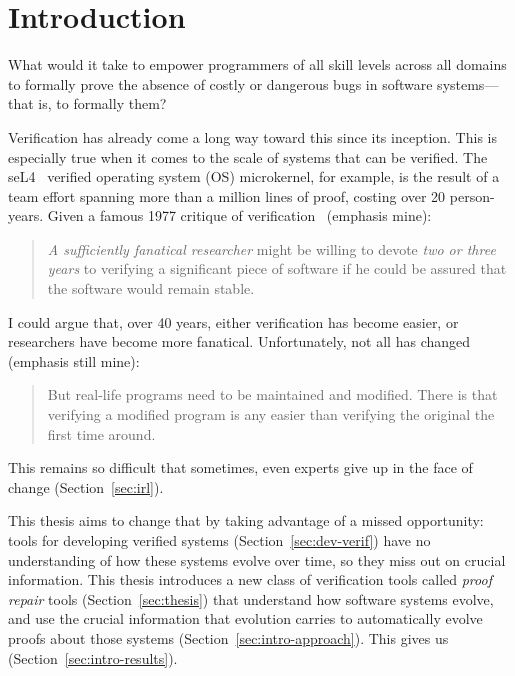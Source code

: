 \chapter{Introduction}



What would it take to empower programmers of all skill levels across all domains to formally prove
the absence of costly or dangerous bugs in software systems---that is, to formally  them?

Verification has already come a long way toward this since its inception.
This is especially true when it comes to the scale of systems that can be verified.
The seL4~\cite{Klein2009} verified operating system (OS) microkernel, for example,
is the result of a team effort spanning more than
a million lines of proof, costing over 20 person-years.
Given a famous 1977 critique of verification~\cite{DeMillo1977} (emphasis mine):

\begin{quote}
\textit{A sufficiently fanatical researcher}
might be willing to devote \textit{two or 
three years} to verifying a significant 
piece of software if he could be 
assured that the software would remain stable.
\end{quote}
I could argue that, over 40 years, either verification has become easier,
or researchers have become more fanatical. Unfortunately, not all has changed (emphasis still mine):

\begin{quote}
But real-life programs need to 
be maintained and modified. 
There is  that verifying a modified program is any 
easier than verifying the original the 
first time around.
\end{quote}
This remains so difficult that sometimes, even experts give up in the face of change (Section~\ref{sec:irl}).

This thesis aims to change that by taking advantage of a missed opportunity: tools for developing verified systems (Section~\ref{sec:dev-verif})
have no understanding of how these systems evolve over time, so they miss out on crucial information.
This thesis introduces a new class of verification tools called \textit{proof repair} tools (Section~\ref{sec:thesis})
that understand how software systems evolve, and use the crucial information that evolution carries
to automatically evolve proofs about those systems (Section~\ref{sec:intro-approach}).
This gives us  (Section~\ref{sec:intro-results}).


